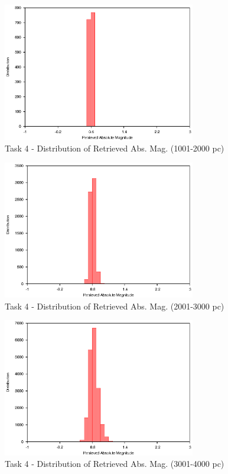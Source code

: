 \documentclass[a4paper,12pt]{article}
\begin{document}
\begin{figure}[H]
\centering
\includegraphics[width=0.75\textwidth]{./Task4/Bin2}
\caption{Task 4 - Distribution of Retrieved Abs. Mag. (1001-2000 pc)}
\label{fig:t4bin2}
\end{figure}

\begin{figure}[H]
\centering
\includegraphics[width=0.75\textwidth]{./Task4/Bin3}
\caption{Task 4 - Distribution of Retrieved Abs. Mag. (2001-3000 pc)}
\label{fig:t4bin3}
\end{figure}

\begin{figure}[H]
\centering
\includegraphics[width=0.75\textwidth]{./Task4/Bin4}
\caption{Task 4 - Distribution of Retrieved Abs. Mag. (3001-4000 pc)}
\label{fig:t4bin4}
\end{figure}
\end{document}
